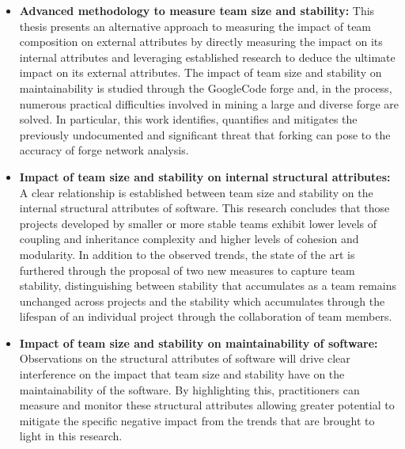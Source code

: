 \begin{itemize}
\item \textbf{Advanced methodology to measure team size and stability:} This thesis presents an alternative approach to measuring the impact of team composition on external attributes by directly measuring the impact on its internal attributes and leveraging established research to deduce the ultimate impact on its external attributes. The impact of team size and stability on maintainability is studied through the GoogleCode forge and, in the process, numerous practical difficulties involved in mining a large and diverse forge are solved. In particular, this work identifies, quantifies and mitigates the previously undocumented and significant threat that forking can pose to the accuracy of forge network analysis.

\item \textbf{Impact of team size and stability on internal structural attributes:} A clear relationship is established between team size and stability on the internal structural attributes of software. This research concludes that those projects developed by smaller or more stable teams exhibit lower levels of coupling and inheritance complexity and higher levels of cohesion and modularity. In addition to the observed trends, the state of the art is furthered through the proposal of two new measures to capture team stability, distinguishing between stability that accumulates as a team remains unchanged across projects and the stability which accumulates through the lifespan of an individual project through the collaboration of team members. 
\item \textbf{Impact of team size and stability on maintainability of software:} Observations on the structural attributes of software will drive clear interference on the impact that team size and stability have on the maintainability of the software. By highlighting this, practitioners can measure and monitor these structural attributes allowing greater potential to mitigate the specific negative impact from the trends that are brought to light in this research.
\end{itemize}

